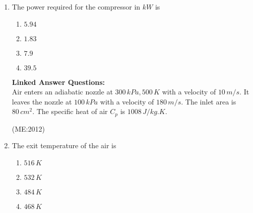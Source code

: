 \documentclass[journal,12pt,onecolumn]{IEEEtran}
\theoremstyle{remark}
\begin{document}
\begin{enumerate}
        \item
		The power required for the compressor in $kW$ is
		\label{d}
		\begin{multicols}{4}
        \begin{enumerate}
            \item $5.94$
            \item $1.83$
            \item $7.9$
            \item $39.5$
        \end{enumerate}
		\end{multicols}
\vspace{0.5cm}
    \textbf{Linked Answer Questions:}\\
    Air enters an adiabatic nozzle at $300 \, kPa, 500 \, K$ with a velocity of $10 \, m/s$. It leaves the nozzle at $100 \, kPa$ with a velocity of $180 \, m/s$. The inlet area is $80 \, {cm}^2$. The specific heat of air $C_p$ is $1008 \, J/kg.K$.

     \hfill{(ME:2012)}

        \item
		The exit temperature of the air is
		\begin{multicols}{4}
        \begin{enumerate}
            \item $516 \, K$
            \item $532 \, K$
            \item $484 \, K$
            \item $468 \, K$
        \end{enumerate}
		\end{multicols}
\end{enumerate}
\end{document}
